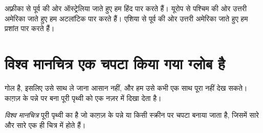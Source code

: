 \begin{example}[अफ़्रीका और ऑस्ट्रेलिया]\label{ex:g3:continents-and-oceans:africa-australia}
अफ़्रीका से पूर्व की ओर ऑस्ट्रेलिया जाते हुए हम हिंद  पार करते हैं।
यूरोप से पश्चिम की ओर उत्तरी अमेरिका जाते हुए हम अटलांटिक  पार करते
हैं। एशिया से पूर्व की ओर उत्तरी अमेरिका जाते हुए हम प्रशांत  पार करते हैं।
\end{example}

\section{विश्व मानचित्र एक चपटा किया गया ग्लोब है}

 गोल है, इसलिए उसे साथ ले जाना आसान नहीं, और हम उसे कभी एक साथ पूरा
नहीं देख सकते। काग़ज़ के पन्ने पर बना  पूरी पृथ्वी को एक नज़र में
दिखा देता है।

\begin{definition}[विश्व मानचित्र]\label{def:g3:continents-and-oceans:world-map}
\emph{विश्व मानचित्र} पूरी पृथ्वी का  है जो
काग़ज़ के पन्ने या किसी स्क्रीन पर चपटा बनाया जाता है, जिसमें सारे 
और सारे  एक ही चित्र में होते हैं।
\end{definition}

